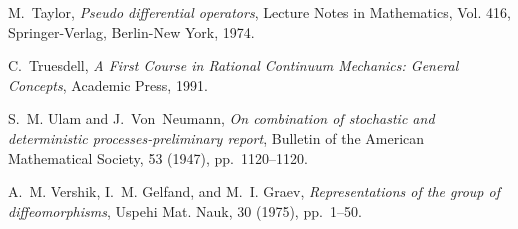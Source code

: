 \documentclass[final,leqno]{siamart}
\begin{document}
\begin{thebibliography}{10}
{\sc M.~Taylor}, {\em Pseudo differential operators}, Lecture Notes in
  Mathematics, Vol. 416, Springer-Verlag, Berlin-New York, 1974.

{\sc C.~Truesdell}, {\em A First Course in Rational Continuum Mechanics:
  General Concepts}, Academic Press, 1991.

{\sc S.~M. Ulam and J.~Von~Neumann}, {\em On combination of stochastic and
  deterministic processes-preliminary report}, Bulletin of the American
  Mathematical Society, 53 (1947), pp.~1120--1120.

{\sc A.~M. Vershik, I.~M. Gelfand, and M.~I. Graev}, {\em Representations of
  the group of diffeomorphisms}, Uspehi Mat. Nauk, 30 (1975), pp.~1--50.

\end{thebibliography}
\end{document}
